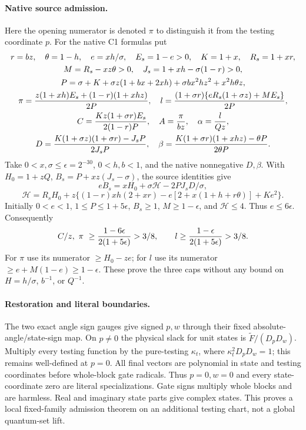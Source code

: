 \documentclass[11pt]{article}
\begin{document}
\paragraph{Native source admission.}
Here the opening numerator is denoted $\pi$ to distinguish it from
the testing coordinate $p$. For the native C1 formulas put
\[
\begin{gathered}
 r=bz,\quad\theta=1-h,\quad e=xh/\sigma,\quad E_s=1-e>0,
 \quad K=1+x,\quad R_s=1+xr,\\
 M=R_s-xz\theta>0,\quad J_s=1+xh-\sigma(1-r)>0,\\
 P=\sigma+K+\sigma z(1+bx+2xh)+\sigma bx^2hz^2+x^2h\theta z,\\
 \pi={z(1+xh)E_s+(1-r)(1+xhz)\over2P},\quad
 l={(1+\sigma r)\{eR_s(1+\sigma z)+ME_s\}\over2P},\\
 C={Kz(1+\sigma r)E_s\over2(1-r)P},\quad
 A={\pi\over bz},\quad\alpha={l\over Qz},\\
 D={K(1+\sigma z)(1+\sigma r)-J_sP\over2J_sP},\quad
 \beta={K(1+\sigma r)(1+xhz)-\theta P\over2\theta P}.
\end{gathered}
\]
Take $0<x,\sigma\le\epsilon=2^{-30}$, $0<h,b<1$, and the native
nonnegative $D,\beta$. With $H_0=1+zQ$, $B_s=P+xz(J_s-\sigma)$,
the source identities give
\[
 eB_s=xH_0+\sigma\mathcal H-2PJ_sD/\sigma,
\]
\[
 \mathcal H=R_sH_0+z\{(1-r)xh(2+xr)
                    -e[2+x(1+h+r\theta)]+Ke^2\}.
\]
Initially $0<e<1$, $1\le P\le1+5\epsilon$, $B_s\ge1$,
$M\ge1-\epsilon$, and $\mathcal H\le4$. Thus $e\le6\epsilon$.
Consequently
\[
 C/z,\ \pi\ \ge{1-6\epsilon\over2(1+5\epsilon)}>3/8,
 \qquad l\ge{1-\epsilon\over2(1+5\epsilon)}>3/8.
\]
For $\pi$ use its numerator $\ge H_0-ze$; for $l$ use its
numerator $\ge e+M(1-e)\ge1-\epsilon$. These prove the three caps
without any bound on $H=h/\sigma$, $b^{-1}$, or $Q^{-1}$.

\paragraph{Restoration and literal boundaries.}
The two exact angle sign gauges give signed $p,w$ through their
fixed absolute-angle/state-sign map. On $p\ne0$ the physical slack
for unit states is $\widetilde F/(D_pD_w)$. Multiply every testing function by the
pure-testing $\kappa_t$, where $\kappa_t^2D_pD_w=1$; this remains
well-defined at $p=0$. All final vectors are polynomial in state and
testing coordinates before whole-block gate radicals. Thus $p=0,w=0$
and every state-coordinate zero are literal specializations. Gate signs
multiply whole blocks and are harmless. Real and imaginary state parts
give complex states. This proves a local fixed-family admission theorem
on an additional testing chart, not a global quantum-set lift.
\end{document}
